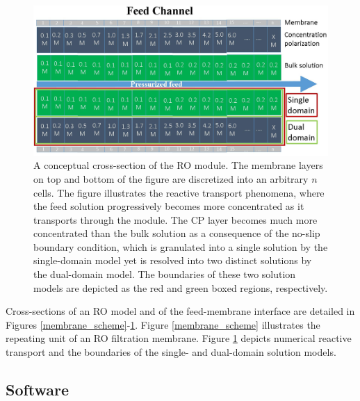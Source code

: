 \begin{figure}[h]
    \centering
    \includegraphics[width = \textwidth]{images/ROSSpy/supporting_information/single_dual_domain.jpg}
    \caption{
        A conceptual cross-section of the RO module. The membrane layers on top and bottom of the figure are discretized into an arbitrary $n$ cells. The figure illustrates the reactive transport phenomena, where the feed solution progressively becomes more concentrated as it transports through the module. The CP layer becomes much more concentrated than the bulk solution as a consequence of the no-slip boundary condition, which is granulated into a single solution by the single-domain model  yet is resolved into two distinct solutions by the dual-domain model. The boundaries of these two solution models are depicted as the red and green boxed regions, respectively. 
    }
    \label{single_dual_domain}
\end{figure}

Cross-sections of an RO model and of the feed-membrane interface are detailed in Figures \ref{membrane_scheme}-\ref{single_dual_domain}. Figure \ref{membrane_scheme} illustrates the repeating unit of an RO filtration membrane. Figure \ref{single_dual_domain} depicts numerical reactive transport and the boundaries of the single- and dual-domain solution models.

\subsection{Software}

